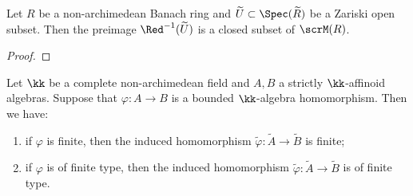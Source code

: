 \begin{example}
\begin{center}
        \end{center}
    \end{example}

    \begin{proposition}\label{prop:reduction_map_inverse_open_subset_to_closed_subset}
        Let \(R\) be a non-archimedean Banach ring and \(\widetilde{U} \subset \Spec(\widetilde{R})\) be a Zariski open subset.
        Then the preimage \(\Red^{-1}(\widetilde{U})\) is a closed subset of \(\scrM(R)\).
    \end{proposition}
    \begin{proof}
    \end{proof}

    \begin{proposition}\label{prop:reduction_map_of_strictly_affinoid_algebra_preserves_finiteness_and_finite_type}
        Let \(\kk\) be a complete non-archimedean field and \(A,B\) a strictly \(\kk\)-affinoid algebras.
        Suppose that \(\varphi: A \to B\) is a bounded \(\kk\)-algebra homomorphism.
        Then we have:
        \begin{enumerate}
            \item if \(\varphi\) is finite, then the induced homomorphism \(\widetilde{\varphi}: \widetilde{A} \to \widetilde{B}\) is finite;
            \item if \(\varphi\) is of finite type, then the induced homomorphism \(\widetilde{\varphi}: \widetilde{A} \to \widetilde{B}\) is of finite type.
        \end{enumerate}
    \end{proposition}


